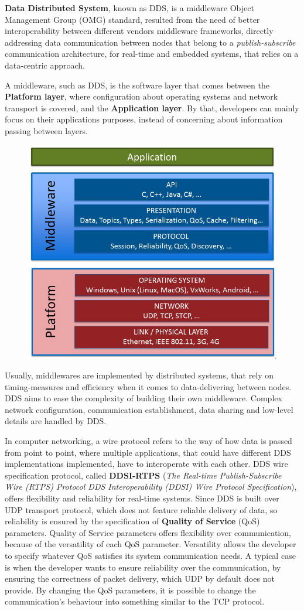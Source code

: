 \textbf{Data Distributed System}, known as DDS, is a middleware Object Management Group (OMG) standard, resulted from the need of better interoperability between different vendors middleware frameworks, directly addressing data communication between nodes that belong to a \textit{publish-subscribe} communication architecture, for real-time and embedded systems, that relies on a data-centric approach. 
            
A middleware, such as DDS, is the software layer that comes between the \textbf{Platform layer}, where configuration about operating systems and network transport is covered, and the \textbf{Application layer}. By that, developers can mainly focus on their applications purposes, instead of concerning about information passing between layers.

\begin{figure}[H]
        \centering
         \includegraphics[width=0.4\linewidth]{images/middleware.png}
\end{figure}

Usually, middlewares are implemented by distributed systems, that rely on timing-measures and efficiency when it comes to data-delivering between nodes. DDS aims to ease the complexity of building their own middleware. Complex network configuration, communication establishment, data sharing and low-level details are handled by DDS.

In computer networking, a wire protocol refers to the way of how data is passed from point to point, where multiple applications, that could have different DDS implementations implemented, have to interoperate with each other. DDS wire specification protocol, called \textbf{DDSI-RTPS} (\textit{The Real-time Publish-Subscribe Wire (RTPS) Protocol DDS Interoperability (DDSI) Wire Protocol Specification}), offers flexibility and reliability for real-time systems. Since DDS is built over UDP transport protocol, which does not feature reliable delivery of data, so reliability is ensured by the specification of \textbf{Quality of Service} (QoS) parameters. Quality of Service parameters offers flexibility over communication, because of the versatility of each QoS parameter. Versatility allows the developer to specify whatever QoS satisfies its system communication needs. A typical case is when the developer wants to ensure reliability over the communication, by ensuring the correctness of packet delivery, which UDP by default does not provide. By changing the QoS parameters, it is possible to change the communication's behaviour into something similar to the TCP protocol.  

